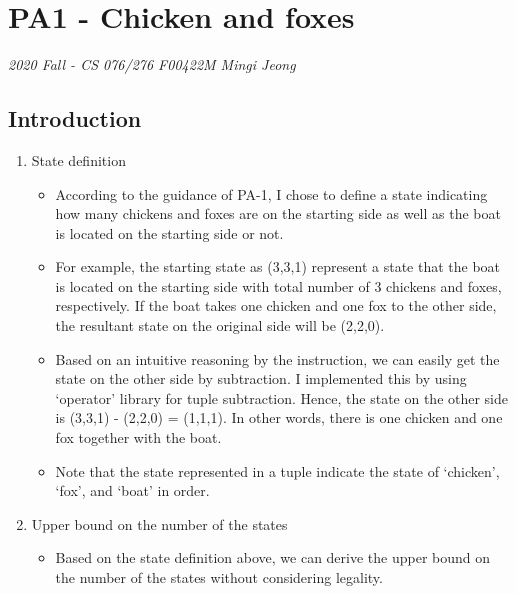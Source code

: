 \documentclass[]{article}
\date{}
\providecommand{\tightlist}{%
  \setlength{\itemsep}{0pt}\setlength{\parskip}{0pt}}
\begin{document}
\section{PA1 - Chicken and foxes}\label{pa1---chicken-and-foxes}

\emph{2020 Fall - CS 076/276 F00422M Mingi Jeong}

\subsection{Introduction}\label{introduction}

\begin{enumerate}
\def\labelenumi{\arabic{enumi}.}
\item
  State definition

  \begin{itemize}
  \tightlist
  \item
    According to the guidance of PA-1, I chose to define a state
    indicating how many chickens and foxes are on the starting side as
    well as the boat is located on the starting side or not.
  \item
    For example, the starting state as (3,3,1) represent a state that
    the boat is located on the starting side with total number of 3
    chickens and foxes, respectively. If the boat takes one chicken and
    one fox to the other side, the resultant state on the original side
    will be (2,2,0).
  \item
    Based on an intuitive reasoning by the instruction, we can easily
    get the state on the other side by subtraction. I implemented this
    by using `operator' library for tuple subtraction. Hence, the state
    on the other side is (3,3,1) - (2,2,0) = (1,1,1). In other words,
    there is one chicken and one fox together with the boat.
  \item
    Note that the state represented in a tuple indicate the state of
    `chicken', `fox', and `boat' in order.
  \end{itemize}
\item
  Upper bound on the number of the states

  \begin{itemize}
  \tightlist
  \item
    Based on the state definition above, we can derive the upper bound
    on the number of the states without considering legality.
  \end{itemize}


\end{enumerate}
\end{document}
